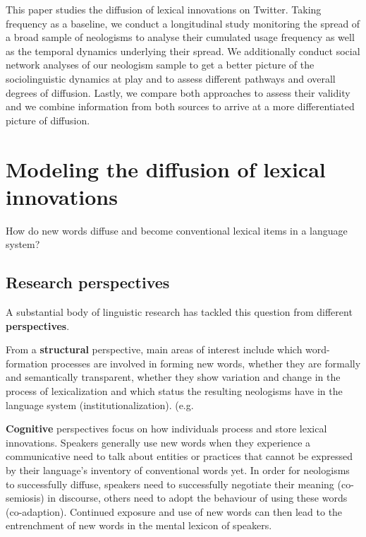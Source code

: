 \documentclass[a4paper, abstract=on]{scrartcl}
\renewcommand{\hw}[1]{\textbf{#1}}
\begin{document}
  This paper studies the diffusion of lexical innovations on Twitter. Taking frequency as a baseline, we conduct a longitudinal study monitoring the spread of a broad sample of neologisms to analyse their cumulated usage frequency as well as the temporal dynamics underlying their spread. We additionally conduct social network analyses of our neologism sample to get a better picture of the sociolinguistic dynamics at play and to assess different pathways and overall degrees of diffusion. Lastly, we compare both approaches to assess their validity and we combine information from both sources to arrive at a more differentiated picture of diffusion.

\section{Modeling the diffusion of lexical innovations}

  How do new words diffuse and become conventional lexical items in a language system?

  \subsection{Research perspectives}

    A substantial body of linguistic research has tackled this question from different \hw{perspectives}. \parencite[16]{Schmid2016}

    From a \hw{structural} perspective, main areas of interest include which word-formation processes are involved in forming new words, whether they are formally and semantically transparent, whether they show variation and change in the process of lexicalization and which status the resulting neologisms have in the language system (institutionalization). (e.g. \cite{Bauer1983,Lipka2005}

    \hw{Cognitive} perspectives focus on how individuals process and store lexical innovations. Speakers generally use new words when they experience a communicative need to talk about entities or practices that cannot be expressed by their language's inventory of conventional words yet. In order for neologisms to successfully diffuse, speakers need to successfully negotiate their meaning (co-semiosis) in discourse, others need to adopt the behaviour of using these words (co-adaption). Continued exposure and use of new words can then lead to the entrenchment of new words in the mental lexicon of speakers.~\parencite{Schmid2008}
\end{document}
